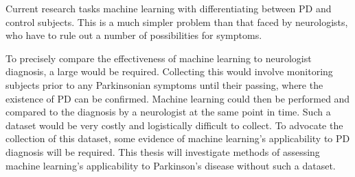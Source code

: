 \documentclass[12pt, twoside]{book}
\renewcommand\emph[1]{\textit{\color{USred}{#1}}}
\begin{document}
\begin{highlight}
	Current research tasks machine learning with differentiating between PD and control subjects. This is a much simpler problem than that faced by neurologists, who have to rule out a number of possibilities for symptoms.
\end{highlight}

To precisely compare the effectiveness of machine learning to neurologist diagnosis, a large \emph{longitudinal dataset} would be required. Collecting this would involve monitoring subjects prior to any Parkinsonian symptoms until their passing, where the existence of PD can be confirmed. Machine learning could then be performed and compared to the diagnosis by a neurologist at the same point in time. Such a dataset would be very costly and logistically difficult to collect. To advocate the collection of this dataset, some evidence of machine learning's applicability to PD diagnosis will be required. This thesis will investigate methods of assessing machine learning's applicability to Parkinson's disease without such a dataset. 











 
\end{document}
